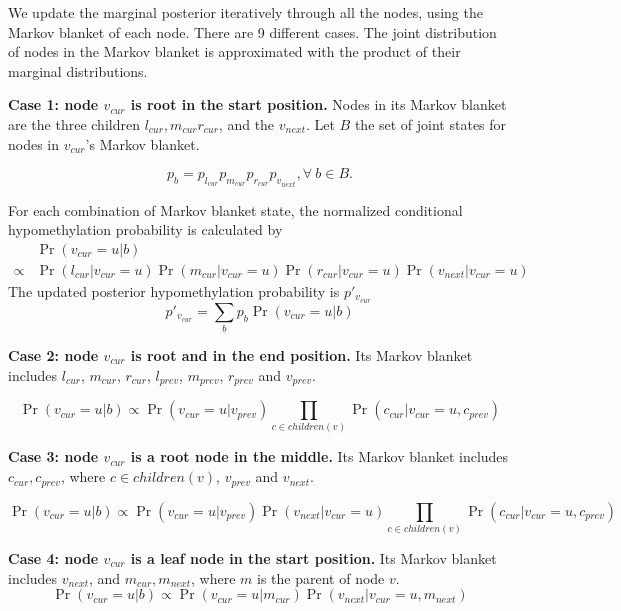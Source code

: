 \documentclass[11pt]{article}
\begin{document}
We update the marginal posterior iteratively through all the nodes,
using the Markov blanket of each node. There are 9 different
cases. The joint distribution of nodes in the Markov blanket is
approximated with the product of their marginal distributions.

\textbf{Case 1: node $v_{cur}$ is root in the start position.} Nodes
in its Markov blanket are the three children $l_{cur},m_{cur}
r_{cur}$, and the $v_{next}$. Let $B$ the set of joint states for nodes in
$v_{cur}$'s Markov blanket.

$$p_{b} = p_{l_{cur}}p_{m_{cur}}p_{r_{cur}}p_{v_{next}}, \forall~b\in B.$$

For each combination of Markov blanket state, the normalized
conditional hypomethylation probability is calculated by
\begin{equation*}
\begin{aligned}
&\Pr(v_{cur} = u|b) \\
\propto & \Pr(l_{cur}| v_{cur} = u)\Pr(m_{cur}| v_{cur} = u)\Pr(r_{cur}| v_{cur} = u) \Pr(v_{next}| v_{cur} = u)
\end{aligned}
\end{equation*}
The updated posterior hypomethylation probability is $p'_{v_{cur}}$
$$ p'_{v_{cur}} = \sum_{b}p_{b}\Pr(v_{cur} = u| b)$$

\textbf{Case 2: node $v_{cur}$ is root and in the end position.} Its
Markov blanket includes $l_{cur}$, $m_{cur}$, $r_{cur}$, $l_{prev}$,
$m_{prev}$, $r_{prev}$ and $v_{prev}$.

\begin{equation*}
\Pr(v_{cur} = u|b)
\propto \Pr(v_{cur} = u| v_{prev})\prod_{c \in children(v)}\Pr(c_{cur}| v_{cur} = u, c_{prev})
\end{equation*}


\textbf{Case 3: node $v_{cur}$ is a root node in the middle.}  Its
Markov blanket includes $c_{cur},c_{prev}$, where $c\in children(v)$,
$v_{prev}$ and $v_{next}$.

\begin{equation*}
\Pr(v_{cur} = u|b)
\propto \Pr(v_{cur} = u| v_{prev}) \Pr(v_{next}|v_{cur} = u)\prod_{c \in children(v)}\Pr(c_{cur}| v_{cur} = u, c_{prev})
\end{equation*}

\textbf{Case 4: node $v_{cur}$ is a leaf node in the start position.}
Its Markov blanket includes $v_{next}$, and $m_{cur}, m_{next}$, where
$m$ is the parent of node $v$.
\begin{equation*}
\Pr(v_{cur} = u|b)
\propto \Pr(v_{cur} = u| m_{cur}) \Pr(v_{next}|v_{cur} = u, m_{next})
\end{equation*}
\end{document}
